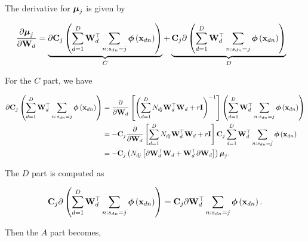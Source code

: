	The derivative for $\boldsymbol{\mu}_j$ is given by
	
	\begin{align}
	\frac{\partial \boldsymbol{\mu}_j}{\partial \mathbf{W}_d} &= \underbrace{\partial\mathbf{C}_j\left(\sum_{d=1}^{D}\mathbf{W}_d^\top\sum_{n:s_{dn}=j}\boldsymbol{\phi}\left(\mathbf{x}_{dn}\right)\right)}_{C} + \underbrace{\mathbf{C}_j\partial\left(\sum_{d=1}^{D}\mathbf{W}_d^\top\sum_{n:s_{dn}=j}\boldsymbol{\phi}\left(\mathbf{x}_{dn}\right)\right)}_{D} 
	\end{align}
	
	For the $C$ part, we have
	
	\begin{align}
	\partial\mathbf{C}_j\left(\sum_{d=1}^{D}\mathbf{W}_d^\top\sum_{n:s_{dn}=j}\boldsymbol{\phi}\left(\mathbf{x}_{dn}\right)\right) &= \frac{\partial}{\partial \mathbf{W}_d}\left[\left(\sum_{d=1}^{D}N_{dj}\mathbf{W}_d^\top\mathbf{W}_d+r\mathbf{I}\right)^{-1}\right]\left(\sum_{d=1}^{D}\mathbf{W}_d^\top\sum_{n:s_{dn}=j}\boldsymbol{\phi}\left(\mathbf{x}_{dn}\right)\right) \notag \\
	&= -\mathbf{C}_j \frac{\partial}{\partial \mathbf{W}_d}\left[\sum_{d=1}^{D}N_{dj}\mathbf{W}_d^\top\mathbf{W}_d+r\mathbf{I}\right]\mathbf{C}_j\sum_{d=1}^{D}\mathbf{W}_d^\top\sum_{n:s_{dn}=j}\boldsymbol{\phi}\left(\mathbf{x}_{dn}\right) \notag\\
	&=-\mathbf{C}_j\left(N_{dj}\left[\partial\mathbf{W}_d^\top\mathbf{W}_d+\mathbf{W}_d^\top\partial\mathbf{W}_d\right]\right)\boldsymbol{\mu}_j.
	\end{align}
	
	The $D$ part is computed as
	
	\begin{align}
	\mathbf{C}_j\partial\left(\sum_{d=1}^{D}\mathbf{W}_d^\top\sum_{n:s_{dn}=j}\boldsymbol{\phi}\left(\mathbf{x}_{dn}\right)\right) = \mathbf{C}_j\partial\mathbf{W}_d^\top\sum_{n:s_{dn}=j}\boldsymbol{\phi}\left(\mathbf{x}_{dn}\right).
	\end{align}
	
	Then the $A$ part becomes,
	
